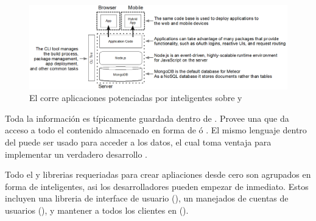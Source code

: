 \begin{figure}[h!]
	\centering
	\includegraphics[width=1.0\textwidth]{figuras/meteor_stack.png}
	\caption{El \stack \meteor corre aplicaciones potenciadas por \packages inteligentes sobre \nodejs y \mongodb}
	\label{figure:meteor_stack}
\end{figure}

Toda la información es típicamente guardada dentro de \mongodb. Provee una \api \javascript que da acceso a todo el contenido almacenado en forma de \documents ó \objects. El mismo lenguaje dentro del \browser puede ser usado para acceder a los datos, el cual \meteor toma ventaja para implementar un verdadero desarrollo \fullstack.

Todo el \software y librerias requeriadas para crear apliaciones \web desde cero son agrupados en forma de \packages inteligentes, asi los desarrolladores pueden empezar de inmediato. Estos \packages incluyen una libreria de interface de usuario (\blazemeteor), un manejados de cuentas de usuarios (\accountsmeteor), y mantener a todos los clientes \reactively \updated en \realtime (\trackermeteor).

